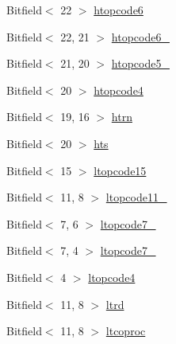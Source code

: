\begin{DoxyCompactItemize}
Bitfield$<$ 22 $>$ \hyperlink{namespaceArmISA_a6cd3028f93a79f8d08c75918887097dc}{htopcode6}
\item 
Bitfield$<$ 22, 21 $>$ \hyperlink{namespaceArmISA_a770ca50360da55e2ed67f6ed3d8a4f2a}{htopcode6\_}
\item 
Bitfield$<$ 21, 20 $>$ \hyperlink{namespaceArmISA_ad1c170174067609535b9a6c3addf43ce}{htopcode5\_}
\item 
Bitfield$<$ 20 $>$ \hyperlink{namespaceArmISA_a4116ef493dcb12f5553dd41f76e58eaa}{htopcode4}
\item 
Bitfield$<$ 19, 16 $>$ \hyperlink{namespaceArmISA_a91f96bd127894c2b4aace943cfe67873}{htrn}
\item 
Bitfield$<$ 20 $>$ \hyperlink{namespaceArmISA_a13e6b4d69eb76e56899adf1a1272be2e}{hts}
\item 
Bitfield$<$ 15 $>$ \hyperlink{namespaceArmISA_aed01ef54c385bd5cb799df739ba6965d}{ltopcode15}
\item 
Bitfield$<$ 11, 8 $>$ \hyperlink{namespaceArmISA_a2065c9f37be3779a0c0274c05b5b0eb9}{ltopcode11\_}
\item 
Bitfield$<$ 7, 6 $>$ \hyperlink{namespaceArmISA_a7ede5cf87d46f1f16b68745294317330}{ltopcode7\_}
\item 
Bitfield$<$ 7, 4 $>$ \hyperlink{namespaceArmISA_ab3c81ba1bdf4b06bc7610fb26b61f220}{ltopcode7\_}
\item 
Bitfield$<$ 4 $>$ \hyperlink{namespaceArmISA_a0634e2c2b9ccaec59159a44a9164ca1f}{ltopcode4}
\item 
Bitfield$<$ 11, 8 $>$ \hyperlink{namespaceArmISA_a4088022c6f68143d07eacb4780030492}{ltrd}
\item 
Bitfield$<$ 11, 8 $>$ \hyperlink{namespaceArmISA_afd597b08722d50eeb4fa504fe1cd3558}{ltcoproc}
\end{DoxyCompactItemize}
